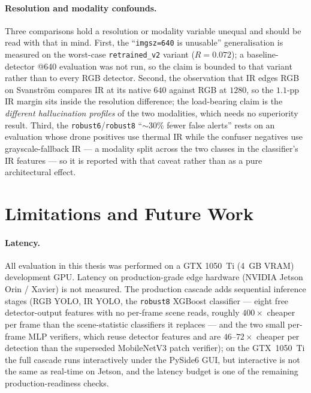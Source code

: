 \documentclass[12pt,a4paper,oneside,openright]{book}
\begin{document}
\paragraph{Resolution and modality confounds.}
Three comparisons hold a resolution or modality variable unequal and should be read with that in mind. First, the ``\texttt{imgsz=640} is unusable'' generalisation is measured on the worst-case \texttt{retrained\_v2} variant ($R=0.072$); a baseline-detector @640 evaluation was not run, so the claim is bounded to that variant rather than to every RGB detector. Second, the observation that IR edges RGB on Svanstr\"om compares IR at its native $640$ against RGB at $1280$, so the $1.1$-pp IR margin sits inside the resolution difference; the load-bearing claim is the \emph{different hallucination profiles} of the two modalities, which needs no superiority result. Third, the \texttt{robust6}/\texttt{robust8} ``$\sim$30\% fewer false alerts'' rests on an evaluation whose drone positives use thermal IR while the confuser negatives use grayscale-fallback IR --- a modality split across the two classes in the classifier's IR features --- so it is reported with that caveat rather than as a pure architectural effect.

\section{Limitations and Future Work}
\label{sec:limits}

\paragraph{Latency.}
All evaluation in this thesis was performed on a GTX 1050~Ti (4~GB VRAM) development GPU. Latency on production-grade edge hardware (NVIDIA Jetson Orin / Xavier) is not measured. The production cascade adds sequential inference stages (RGB YOLO, IR YOLO, the \texttt{robust8} XGBoost classifier --- eight free detector-output features with no per-frame scene reads, roughly $400\times$ cheaper per frame than the scene-statistic classifiers it replaces --- and the two small per-frame MLP verifiers, which reuse detector features and are $46$--$72\times$ cheaper per detection than the superseded MobileNetV3 patch verifier); on the GTX~1050~Ti the full cascade runs interactively under the PySide6 GUI, but interactive is not the same as real-time on Jetson, and the latency budget is one of the remaining production-readiness checks.
\end{document}
